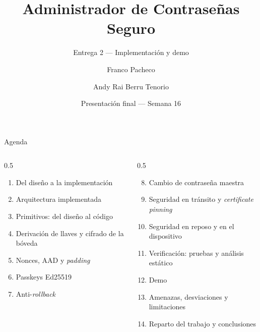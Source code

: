 \documentclass[aspectratio=169,10pt]{beamer}
\title[Gestor de contraseñas E2E]{Administrador de Contraseñas Seguro}
\subtitle{Entrega 2 — Implementación y demo}
\author[Pacheco · Berru]{Franco Pacheco \and Andy Rai Berru Tenorio}
\institute[UTEC]{Criptografía \\ Universidad de Ingeniería y Tecnología (UTEC)}
\date[Semana 16]{Presentación final — Semana 16}
\begin{document}
\begin{frame}[plain]
  \titlepage
\end{frame}

\begin{frame}{Agenda}
  \small
  \begin{columns}[T]
    \begin{column}{0.5\textwidth}
      \begin{enumerate}
        \item Del diseño a la implementación
        \item Arquitectura implementada
        \item Primitivos: del diseño al código
        \item Derivación de llaves y cifrado de la bóveda
        \item Nonces, AAD y \emph{padding}
        \item Passkeys Ed25519
        \item Anti-\emph{rollback}
      \end{enumerate}
    \end{column}
    \begin{column}{0.5\textwidth}
      \begin{enumerate}
        \setcounter{enumi}{7}
        \item Cambio de contraseña maestra
        \item Seguridad en tránsito y \emph{certificate pinning}
        \item Seguridad en reposo y en el dispositivo
        \item Verificación: pruebas y análisis estático
        \item Demo
        \item Amenazas, desviaciones y limitaciones
        \item Reparto del trabajo y conclusiones
      \end{enumerate}
    \end{column}
  \end{columns}
\end{frame}
\end{document}
